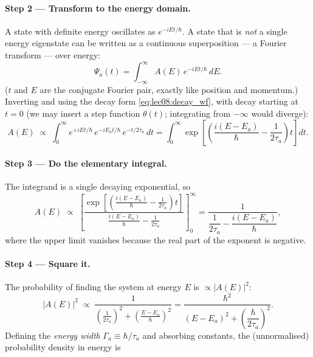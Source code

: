 \paragraph{Step 2 --- Transform to the energy domain.}
A state with definite energy oscillates as $e^{-iEt/\hbar}$.  A state that is
\emph{not} a single energy eigenstate can be written as a continuous
superposition --- a Fourier transform --- over energy:
\begin{equation}
  \label{eq:lec08:fourier}
  \Psi_a(t) = \int_{-\infty}^{\infty} A(E)\,e^{-iEt/\hbar}\,dE .
\end{equation}
($t$ and $E$ are the conjugate Fourier pair, exactly like position and momentum.)
Inverting and using the decay form \eqref{eq:lec08:decay_wf}, with decay starting
at $t=0$ (we may insert a step function $\theta(t)$; integrating from $-\infty$
would diverge):
\begin{equation}
  \label{eq:lec08:AE_integral}
  A(E) \;\propto\; \int_{0}^{\infty}
     e^{+iEt/\hbar}\,e^{-iE_a t/\hbar}\,e^{-t/2\tau_a}\,dt
   = \int_{0}^{\infty}
     \exp\!\left[\left(\frac{i(E-E_a)}{\hbar} - \frac{1}{2\tau_a}\right)t\right]dt .
\end{equation}

\paragraph{Step 3 --- Do the elementary integral.}
The integrand is a single decaying exponential, so
\begin{equation}
  \label{eq:lec08:AE_result}
  A(E) \;\propto\;
  \left[\frac{\exp\!\left[\left(\tfrac{i(E-E_a)}{\hbar}-\tfrac{1}{2\tau_a}\right)t\right]}
             {\tfrac{i(E-E_a)}{\hbar}-\tfrac{1}{2\tau_a}}\right]_{0}^{\infty}
   = \frac{1}{\dfrac{1}{2\tau_a} - \dfrac{i(E-E_a)}{\hbar}},
\end{equation}
where the upper limit vanishes because the real part of the exponent is negative.

\paragraph{Step 4 --- Square it.}
The probability of finding the system at energy $E$ is $\propto |A(E)|^2$:
\begin{equation}
  \label{eq:lec08:AE_squared}
  |A(E)|^2 \;\propto\;
  \frac{1}{\left(\tfrac{1}{2\tau_a}\right)^2 + \left(\tfrac{E-E_a}{\hbar}\right)^2}
  = \frac{\hbar^2}{(E-E_a)^2 + \left(\dfrac{\hbar}{2\tau_a}\right)^2}.
\end{equation}
Defining the \emph{energy width} $\Gamma_a \equiv \hbar/\tau_a$ and absorbing
constants, the (unnormalised) probability density in energy is

